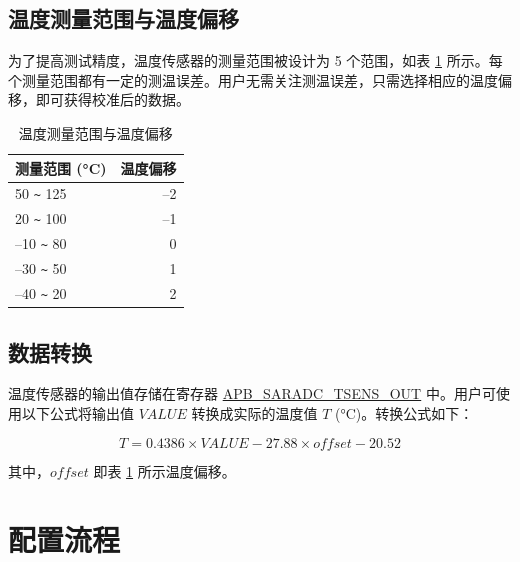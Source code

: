 \documentclass[main\_\_CN.tex]{subfiles}
\begin{document}
\subsection{温度测量范围与温度偏移}

为了提高测试精度，温度传感器的测量范围被设计为 5 个范围，如表 \ref{tab:tsensor-dac} 所示。每个测量范围都有一定的测温误差。用户无需关注测温误差，只需选择相应的温度偏移，即可获得校准后的数据。
\begin{longtable}[c]{|l|r|}
    \caption{温度测量范围与温度偏移}
    \label{tab:tsensor-dac}
    \\\hline
    \rowcolor{lightgray}
    测量范围 (°C)  & 温度偏移 \\\hline
    50 \verb+~+ 125 & –2 \\\hline
    20 \verb+~+ 100 &  –1 \\\hline
    –10 \verb+~+ 80 &  0 \\\hline
    –30 \verb+~+ 50 &  1 \\\hline
    –40 \verb+~+ 20 &  2 \\\hline
\end{longtable}

\subsection{数据转换}

温度传感器的输出值存储在寄存器 \hyperref[fielddesc:APBSARADCTSENSOUT]{APB\_SARADC\_TSENS\_OUT} 中。用户可使用以下公式将输出值 \(VALUE\) 转换成实际的温度值 \(T\) (°C)。转换公式如下：

\[
        T = 0.4386 \times VALUE - 27.88 \times offset - 20.52
\]

其中，\(offset\) 即表 \ref{tab:tsensor-dac} 所示温度偏移。

\section{配置流程}
\end{document}
